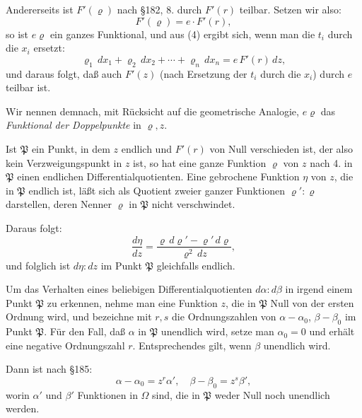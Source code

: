 \documentclass[12pt,a4paper]{article}
\begin{document}
Andererseits ist $F'(\varrho)$ nach \S 182, 8. durch $F'(r)$ teilbar. Setzen wir also:
\begin{equation}\label{eq:195-6}
F'(\varrho) = e \cdot F'(r),
\end{equation}
so ist $e\varrho$ ein ganzes Funktional, und aus (4) ergibt sich, wenn man die $t_i$ durch die $x_i$ ersetzt:
\begin{equation}\label{eq:195-7}
\varrho_1\,dx_1 + \varrho_2\,dx_2 + \cdots + \varrho_n\,dx_n = e\,F'(r)\,dz,
\end{equation}
und daraus folgt, daß auch $F'(z)$ (nach Ersetzung der $t_i$ durch die $x_i$) durch $e$ teilbar ist.

Wir nennen demnach, mit Rücksicht auf die geometrische Analogie, $e\varrho$ das \emph{Funktional der Doppelpunkte} in $\varrho, z$.

Ist $\mathfrak{P}$ ein Punkt, in dem $z$ endlich und $F'(r)$ von Null verschieden ist, der also kein Verzweigungspunkt in $z$ ist, so hat eine ganze Funktion $\varrho$ von $z$ nach 4. in $\mathfrak{P}$ einen endlichen Differentialquotienten. Eine gebrochene Funktion $\eta$ von $z$, die in $\mathfrak{P}$ endlich ist, läßt sich als Quotient zweier ganzer Funktionen $\varrho':\varrho$ darstellen, deren Nenner $\varrho$ in $\mathfrak{P}$ nicht verschwindet.

Daraus folgt:
\[
\frac{d\eta}{dz} = \frac{\varrho\,d\varrho' - \varrho'\,d\varrho}{\varrho^2\,dz},
\]
und folglich ist $d\eta:dz$ im Punkt $\mathfrak{P}$ gleichfalls endlich.

Um das Verhalten eines beliebigen Differentialquotienten $d\alpha:d\beta$ in irgend einem Punkt $\mathfrak{P}$ zu erkennen, nehme man eine Funktion $z$, die in $\mathfrak{P}$ Null von der ersten Ordnung wird, und bezeichne mit $r, s$ die Ordnungszahlen von $\alpha - \alpha_0$, $\beta - \beta_0$ im Punkt $\mathfrak{P}$. Für den Fall, daß $\alpha$ in $\mathfrak{P}$ unendlich wird, setze man $\alpha_0 = 0$ und erhält eine negative Ordnungszahl $r$. Entsprechendes gilt, wenn $\beta$ unendlich wird.

Dann ist nach \S 185:
\begin{equation}\label{eq:195-8}
\alpha - \alpha_0 = z^r \alpha', \quad \beta - \beta_0 = z^s \beta',
\end{equation}
worin $\alpha'$ und $\beta'$ Funktionen in $\Omega$ sind, die in $\mathfrak{P}$ weder Null noch unendlich werden.
\end{document}
